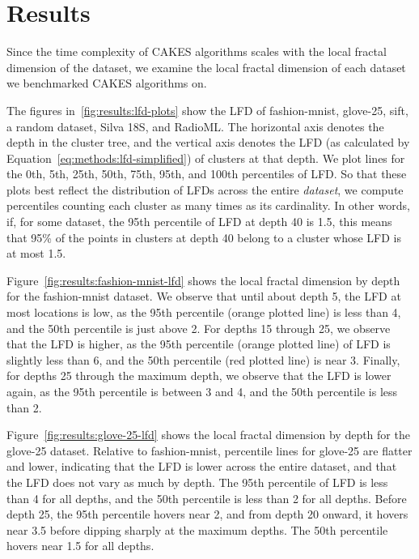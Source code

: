 \section{Results}
\label{sec:results}


Since the time complexity of CAKES algorithms scales with the local fractal dimension of the dataset, we examine the local fractal dimension of each dataset we benchmarked CAKES algorithms on. 


The figures in~\ref{fig:results:lfd-plots} show the LFD of fashion-mnist, glove-25, sift, a random dataset, Silva 18S, and RadioML.
The horizontal axis denotes the depth in the cluster tree, and the vertical axis denotes the LFD (as calculated by Equation~\ref{eq:methods:lfd-simplified}) of clusters at that depth.
We plot lines for the 0th, 5th, 25th, 50th, 75th, 95th, and 100th percentiles of LFD.
So that these plots best reflect the distribution of LFDs across the entire \emph{dataset}, we compute percentiles counting each cluster as many times as its cardinality. 
In other words, if, for some dataset, the 95th percentile of LFD at depth 40 is 1.5, this means that 95\% of the points in clusters at depth 40 belong to a cluster whose LFD is at most 1.5.


Figure~\ref{fig:results:fashion-mnist-lfd} shows the local fractal dimension by depth for the fashion-mnist dataset. 
We observe that until about depth 5, the LFD at most locations is low, as the 95th percentile (orange plotted line) is less than 4, and the 50th percentile is just above 2.
For depths 15 through 25, we observe that the LFD is higher, as the 95th percentile (orange plotted line) of LFD is slightly less than 6, and the 50th percentile (red plotted line) is near 3.
Finally, for depths 25 through the maximum depth, we observe that the LFD is lower again, as the 95th percentile is between 3 and 4, and the 50th percentile is less than 2.


Figure~\ref{fig:results:glove-25-lfd} shows the local fractal dimension by depth for the glove-25 dataset. 
Relative to fashion-mnist, percentile lines for glove-25 are flatter and lower, indicating that the LFD is lower across the entire dataset, and that the LFD does not vary as much by depth.
The 95th percentile of LFD is less than 4 for all depths, and the 50th percentile is less than 2 for all depths. 
Before depth 25, the 95th percentile hovers near 2, and from depth 20 onward, it hovers near 3.5 before dipping sharply at the maximum depths. 
The 50th percentile hovers near 1.5 for all depths. 


